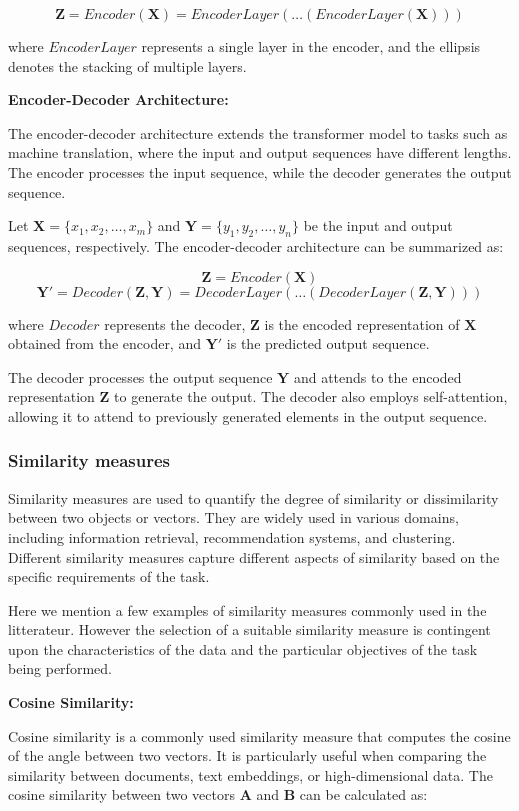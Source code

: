 \documentclass[a4paper,12pt]{article}
\begin{document}
$$\mathbf{Z} = Encoder(\mathbf{X}) = EncoderLayer(\ldots(EncoderLayer(\mathbf{X})))$$

where $EncoderLayer$ represents a single layer in the encoder, and the ellipsis denotes the stacking of multiple layers.

\textbf{Encoder-Decoder Architecture:}

The encoder-decoder architecture extends the transformer model to tasks such as machine translation, where the input and output sequences have different lengths. The encoder processes the input sequence, while the decoder generates the output sequence.

Let $\mathbf{X} = \{x_1, x_2, \ldots, x_m\}$ and $\mathbf{Y} = \{y_1, y_2, \ldots, y_n\}$ be the input and output sequences, respectively. The encoder-decoder architecture can be summarized as:

$$\mathbf{Z} = Encoder(\mathbf{X})$$
$$\mathbf{Y'} = Decoder(\mathbf{Z}, \mathbf{Y}) = DecoderLayer(\ldots(DecoderLayer(\mathbf{Z}, \mathbf{Y})))$$

where $Decoder$ represents the decoder, $\mathbf{Z}$ is the encoded representation of $\mathbf{X}$ obtained from the encoder, and $\mathbf{Y'}$ is the predicted output sequence.

The decoder processes the output sequence $\mathbf{Y}$ and attends to the encoded representation $\mathbf{Z}$ to generate the output. The decoder also employs self-attention, allowing it to attend to previously generated elements in the output sequence.

\subsubsection{Similarity measures}
Similarity measures are used to quantify the degree of similarity or dissimilarity between two objects or vectors. They are widely used in various domains, including information retrieval, recommendation systems, and clustering. Different similarity measures capture different aspects of similarity based on the specific requirements of the task.

Here we mention a few examples of similarity measures commonly used in the litterateur. However the selection of a suitable similarity measure is contingent upon the characteristics of the data and the particular objectives of the task being performed.

\textbf{Cosine Similarity:}

Cosine similarity is a commonly used similarity measure that computes the cosine of the angle between two vectors. It is particularly useful when comparing the similarity between documents, text embeddings, or high-dimensional data. The cosine similarity between two vectors $\mathbf{A}$ and $\mathbf{B}$ can be calculated as:
\end{document}
